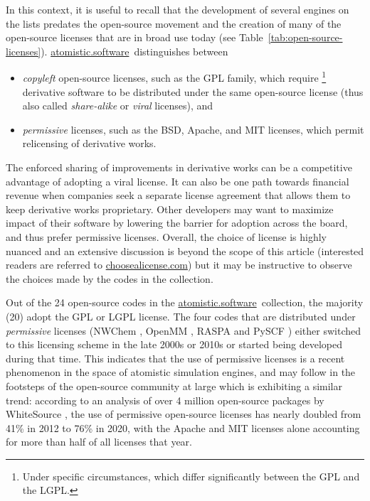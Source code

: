 \documentclass[9pt,review]{livecoms}
\newcommand{\atsoft}{\href{https://atomistic.software}{atomistic.software}\ }
\begin{document}
In this context, it is useful to recall that the development of several engines on the lists predates the open-source movement and the creation of many of the open-source licenses that are in broad use today (see Table~\ref{tab:open-source-licenses}).
\atsoft distinguishes between 
\begin{itemize}
    \item 
        \emph{copyleft} open-source licenses, such as the GPL family, which require%
\footnote{Under specific circumstances, which differ significantly between the GPL and the LGPL.}
        derivative software to be distributed under the same open-source license (thus also called \emph{share-alike} or \emph{viral} licenses), and
\item
\emph{permissive} licenses, such as the BSD, Apache, and MIT licenses, which permit relicensing of derivative works.
\end{itemize}

The enforced sharing of improvements in derivative works can be a competitive advantage of adopting a viral license. 
It can also be one path towards financial revenue when companies seek a separate license agreement that allows them to keep derivative works proprietary.
Other developers may want to maximize impact of their software by lowering the barrier for adoption across the board, and thus prefer permissive licenses.
Overall, the choice of license is highly nuanced and an extensive discussion is beyond the scope of this article (interested readers are referred to \url{choosealicense.com}) but it may be instructive to observe the choices made by the codes in the collection.

Out of the 24 open-source codes in the \atsoft collection, the majority (20) adopt the GPL or LGPL license.
The four codes that are distributed under \emph{permissive} licenses (NWChem \cite{Apra2020}, OpenMM \cite{Eastman2017}, RASPA \cite{Dubbeldam2016a} and PySCF \cite{Sun2020a}) either switched to this licensing scheme in the late 2000s or 2010s or started being developed during that time.
This indicates that the use of permissive licenses is a recent phenomenon in the space of atomistic simulation engines, and may follow in the footsteps of the open-source community at large which is exhibiting a similar trend:
according to an analysis of over 4 million open-source packages by WhiteSource \cite{WhiteSource2021}, the use of permissive open-source licenses has nearly doubled from 41\% in 2012 to 76\% in 2020, with the Apache and MIT licenses alone accounting for more than half of all licenses that year.
\end{document}
